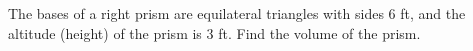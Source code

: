 The bases of a right prism are equilateral triangles with sides $6$ ft, and the altitude (height) of the prism is $3$ ft. Find the volume of the prism.
